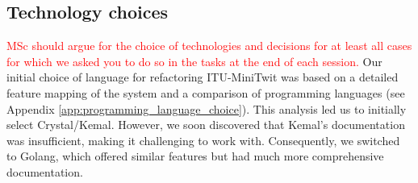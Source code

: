 \subsection{Technology choices}%
\textcolor{red}{MSc should argue for the choice of technologies and decisions for at least all cases for which we asked you to do so in the tasks at the end of each session.}
Our initial choice of language for refactoring ITU-MiniTwit was based on a detailed feature mapping of the system and a comparison of programming languages (see Appendix \ref{app:programming_language_choice}). 
This analysis led us to initially select Crystal/Kemal. However, we soon discovered that Kemal's documentation was insufficient, making it challenging to work with. Consequently, we switched to Golang, which offered similar features but had much more comprehensive documentation.